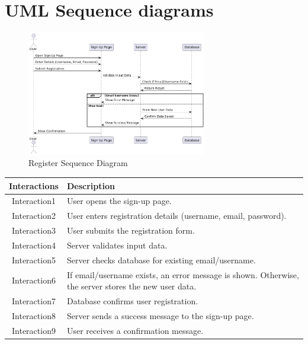 \chapter{UML Sequence diagrams}
\begin{figure}[h]
    \centering
    \includegraphics[width=0.7\textwidth]{images/register.png} %
    \caption{Register Sequence Diagram}
    \label{fig:example}
\end{figure}
\begin{longtable}{|c|p{10cm}|}
    \hline
    \textbf{Interactions} & \textbf{ Description} \\
    \hline
     Interaction1 & User opens the sign-up page. \\
    \hline
    Interaction2 & User enters registration details (username, email, password). \\
    \hline
    Interaction3 & User submits the registration form. \\
    \hline
    Interaction4 & Server validates input data. \\
    \hline
    Interaction5 & Server checks database for existing email/username. \\
    \hline
    Interaction6 & If email/username exists, an error message is shown. Otherwise, the server stores the new user data. \\
    \hline
    Interaction7 & Database confirms user registration. \\
    \hline
    Interaction8 & Server sends a success message to the sign-up page. \\
    \hline
    Interaction9 & User receives a confirmation message. \\
    \hline
\end{longtable}
\newpage

